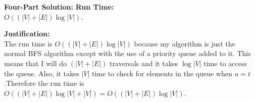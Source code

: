 \documentclass[11pt]{article}
\newenvironment{FourPartSolution}{\par{\bf Four-Part Solution:}}{\smallskip}
\newenvironment{runTime}{{\bf Run Time:}}{\smallskip}
\newenvironment{justification}{\par{\bf Justification:}}{\smallskip}
\begin{document}
\begin{FourPartSolution}
\begin{runTime}
\\
$O((|V| + |E|)\log{|V|})$.
\end{runTime}
\\
\begin{justification}
\\
The run time is $O((|V| + |E|)\log{|V|})$ because my algorithm is just the normal BFS algorithm except with the use of a priority queue added to it. This means that I will do $(|V| + |E|)$ traversals and it takes $\log{|V|}$ time to access the queue. Also, it takes $|V|$ time to check for elements in the queue when $u = t$.Therefore the run time is $O((|V| + |E|)\log{|V|} + |V|) = O((|V| + |E|)\log{|V|})$.
\end{justification}
\end{FourPartSolution}



\newpage
\end{document}
